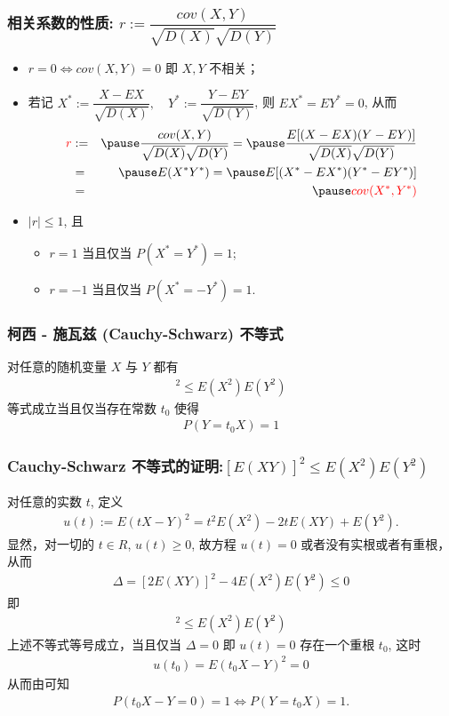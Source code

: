 \begin{frame}
	\frametitle{相关系数的性质: $ r:=\dfrac{cov (X,Y)}{\sqrt{D (X)}\sqrt{D (Y)}}$}
	\begin{itemize}[<+-|alert@+>]
		\item $r=0\Leftrightarrow cov (X,Y)=0$ 即 $X,Y$ 不相关；
		\item 若记 $X^*:=\dfrac{X-EX}{\sqrt{D (X)}}, \quad Y^*:=\dfrac{Y-EY}{\sqrt{D (Y)}}$, 则 $EX^*=EY^*=0$, 从而
		\begin{eqnarray*}
			\textcolor{red}{r}&:=&\pause \dfrac{cov(X,Y)}{\sqrt{D(X)}\sqrt{D(Y)}}=\pause \dfrac{E[(X-EX)(Y-EY)]}{\sqrt{D(X)}\sqrt{D(Y)}}\\
			&=&\pause E(X^*Y^*)=\pause E[(X^*-EX^*)(Y^*-EY^*)]\\
			&=&\pause \textcolor{red}{cov(X^*,Y^*)}
		\end{eqnarray*}
		\item $|r|\le 1$, 且
		\begin{itemize}
			\item $r=1$ 当且仅当 $P (X^*=Y^*)=1$;
			\item $r=-1$ 当且仅当 $P (X^*=-Y^*)=1$.
		\end{itemize}
	\end{itemize}
\end{frame}
\begin{frame}
	\frametitle{柯西 - 施瓦兹 (Cauchy-Schwarz) 不等式}
	\begin{thm}
		对任意的随机变量 $X$ 与 $Y$ 都有
		\begin{eqnarray*}
			[E(XY)]^2\le E(X^2)E(Y^2)
		\end{eqnarray*}
		等式成立当且仅当存在常数 $t_0$ 使得
		\begin{eqnarray*}
			P(Y=t_0X)=1
		\end{eqnarray*}
	\end{thm}

\end{frame}
\begin{frame}
	\frametitle{Cauchy-Schwarz 不等式的证明:$[E (XY)]^2\le E (X^2) E (Y^2)
		$}

	\zheng 对任意的实数 $t$, 定义
	\begin{eqnarray*}
		u(t):=E(tX-Y)^2=t^2E(X^2)-2tE(XY)+E(Y^2).
	\end{eqnarray*}
	\pause 显然，对一切的 $t\in R$, $u (t)\ge 0$, 故方程 $u (t)=0$ 或者没有实根或者有重根，从而
	\pause \begin{eqnarray*}
		\Delta=[2E(XY)]^2-4E(X^2)E(Y^2)\le 0
	\end{eqnarray*}
	\pause  即
	\begin{eqnarray*}
		[E(XY)]^2\le E(X^2)E(Y^2)
	\end{eqnarray*}
	\pause 上述不等式等号成立，当且仅当 $\Delta=0$ 即 $u (t)=0$ 存在一个重根 $t_0$, 这时
	\begin{eqnarray*}
		u(t_0)=E(t_0X-Y)^2=0
	\end{eqnarray*}
	\pause 从而由可知 %
	\begin{eqnarray*}
		P(t_0X-Y=0)=1 \Leftrightarrow P(Y=t_0X)=1.
	\end{eqnarray*}

\end{frame}

